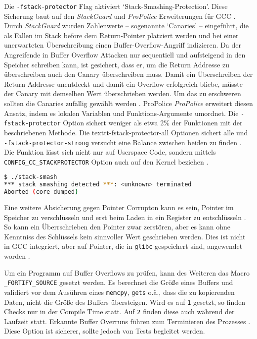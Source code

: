 Die \texttt{-fstack-protector} Flag aktiviert `Stack-Smashing-Protection'. 
Diese Sicherung baut auf den \textit{StackGuard} und \textit{ProPolice} Erweiterungen für GCC \cite{stackguard, shacham_2004}.
Durch \textit{StackGuard} wurden Zahlenwerte -- sogenannte `Canaries' -- eingeführt, die als Fallen im Stack before dem Return-Pointer platziert werden und bei einer unerwarteten Überschreibung einen Buffer-Overflow-Angriff indizieren. Da der Angreifende in Buffer Overflow Attacken nur sequentiell und aufsteigend in den Speicher schreiben kann, ist gesichert, dass er, um die Return Addresse zu überschreiben auch den Canary überschreiben muss. Damit ein Überschreiben der Return Addresse unentdeckt und damit ein Overflow erfolgreich bliebe, müsste der Canary mit demselben Wert überschrieben werden. Um das zu erschweren sollten die Canaries zufällig gewählt werden \cite{stackguard}. 
ProPolice \textit{ProPolice} erweitert diesen Ansatz, indem es lokalen Variablen und Funktions-Argumente umordnet.
Die \texttt{-fstack-protector} Option sichert weniger als etwa 2\% der Funktionen mit der beschriebenen Methode. Die texttt{-fstack-protector-all} Optionen sichert alle und \texttt{-fstack-protector-strong} versucht eine Balance zwischen beiden zu finden \cite{stack-protector-strong}.
Die Funktion lässt sich nicht nur auf Userspace Code, sondern mittels \texttt{CONFIG\_CC\_STACKPROTECTOR} Option auch auf den Kernel beziehen \cite{ubuntu-security}.

\begin{lstlisting}[language=bash]
$ ./stack-smash
*** stack smashing detected ***: <unknown> terminated
Aborted (core dumped)
\end{lstlisting}

Eine weitere Absicherung gegen Pointer Corrupton kann es sein, Pointer im Speicher zu verschlüsseln und erst beim Laden in ein Register zu entschlüsseln \cite{pointguard}. So kann ein Überrschrieben den Pointer zwar zerstören, aber es kann ohne Kenntniss des Schlüssels kein sinnvoller Wert geschrieben werden. Dies ist nicht in GCC integriert, aber auf Pointer, die in \texttt{glibc} gespeichert sind, angewendet worden \cite{ubuntu-security}.

Um ein Programm auf Buffer Overflows zu prüfen, kann des Weiteren das Macro \texttt{\_FORTIFY\_SOURCE} gesetzt werden. Es berechnet die Größe eines Buffers und validiert vor dem Ausühren eines \texttt{memcpy}, \texttt{gets} o.ä., dass die zu kopierenden Daten, nicht die Größe des Buffers übersteigen.
Wird es auf \texttt{1} gesetzt, so finden Checks nur in der Compile Time statt. Auf \texttt{2} finden diese auch während der Laufzeit statt. Erkannte Buffer Overruns führen zum Terminieren des Prozesses \cite{man-fortify}. Diese Option ist sicherer, sollte jedoch von Tests begleitet werden. 

